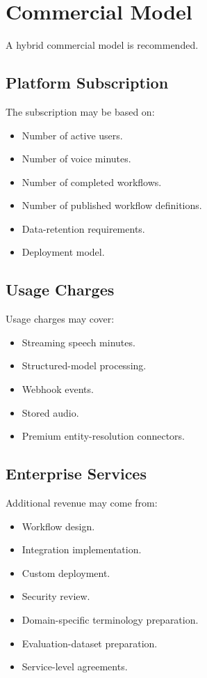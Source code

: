 \documentclass[11pt,a4paper]{article}
\begin{document}
\section{Commercial Model}

A hybrid commercial model is recommended.

\subsection{Platform Subscription}

The subscription may be based on:

\begin{itemize}
\item Number of active users.
\item Number of voice minutes.
\item Number of completed workflows.
\item Number of published workflow definitions.
\item Data-retention requirements.
\item Deployment model.
\end{itemize}

\subsection{Usage Charges}

Usage charges may cover:

\begin{itemize}
\item Streaming speech minutes.
\item Structured-model processing.
\item Webhook events.
\item Stored audio.
\item Premium entity-resolution connectors.
\end{itemize}

\subsection{Enterprise Services}

Additional revenue may come from:

\begin{itemize}
\item Workflow design.
\item Integration implementation.
\item Custom deployment.
\item Security review.
\item Domain-specific terminology preparation.
\item Evaluation-dataset preparation.
\item Service-level agreements.
\end{itemize}
\end{document}
